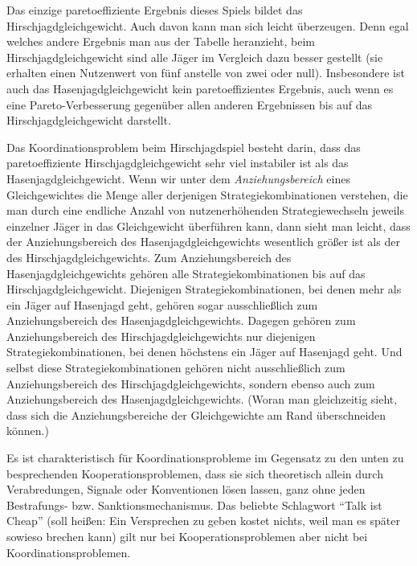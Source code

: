 Das einzige paretoeffiziente Ergebnis dieses Spiels bildet das
Hirschjagdgleichgewicht. Auch davon kann man sich leicht überzeugen. Denn egal
welches andere Ergebnis man aus der Tabelle heranzieht, beim
Hirschjagdgleichgewicht sind alle Jäger im Vergleich dazu besser gestellt
(sie erhalten einen Nutzenwert von fünf anstelle von zwei oder null).
Insbesondere ist auch das Hasenjagdgleichgewicht kein paretoeffizientes
Ergebnis, auch wenn es eine Pareto-Verbesserung gegenüber allen anderen
Ergebnissen bis auf das Hirschjagdgleichgewicht darstellt.

Das Koordinationsproblem beim Hirschjagdspiel besteht
darin, dass das paretoeffiziente Hirschjagdgleichgewicht sehr viel instabiler ist als das
Hasenjagdgleichgewicht. Wenn wir unter dem {\em Anziehungsbereich} eines
Gleichgewichtes die Menge aller derjenigen Strategiekombinationen verstehen, die
man durch eine endliche Anzahl von nutzenerhöhenden Strategiewechseln
jeweils einzelner Jäger in das Gleichgewicht überführen kann, dann sieht man
leicht, dass der Anziehungsbereich des Hasenjagdgleichgewichts wesentlich
größer ist als der des Hirschjagdgleichgewichts. Zum Anziehungsbereich des
Hasenjagdgleichgewichts gehören alle Strategiekombinationen bis auf das
Hirschjagdgleichgewicht. Diejenigen Strategiekombinationen, bei denen
mehr als ein Jäger auf Hasenjagd geht, gehören sogar ausschließlich zum
Anziehungsbereich des Hasenjagdgleichgewichts. Dagegen gehören zum
Anziehungsbereich des Hirschjagdgleichgewichts nur diejenigen Strategiekombinationen, bei denen
höchstens ein Jäger auf Hasenjagd geht. Und selbst diese Strategiekombinationen
gehören nicht ausschließlich zum Anziehungsbereich des
Hirschjagdgleichgewichts, sondern ebenso auch zum Anziehungsbereich des
Hasenjagdgleichgewichts. (Woran man gleichzeitig sieht, dass sich die
Anziehungsbereiche der Gleichgewichte am Rand überschneiden können.)

Es ist charakteristisch für Koordinationsprobleme im Gegensatz zu den unten zu
besprechenden Kooperationsproblemen, dass sie sich theoretisch allein durch
Verabredungen, Signale oder Konventionen lösen lassen, ganz ohne jeden
Bestrafungs- bzw. Sanktionsmechanismus. Das beliebte Schlagwort "`Talk ist
Cheap"' (soll heißen: Ein Versprechen zu geben kostet nichts, weil man es später
sowieso brechen kann) gilt nur bei Kooperationsproblemen aber nicht bei
Koordinationsproblemen.

